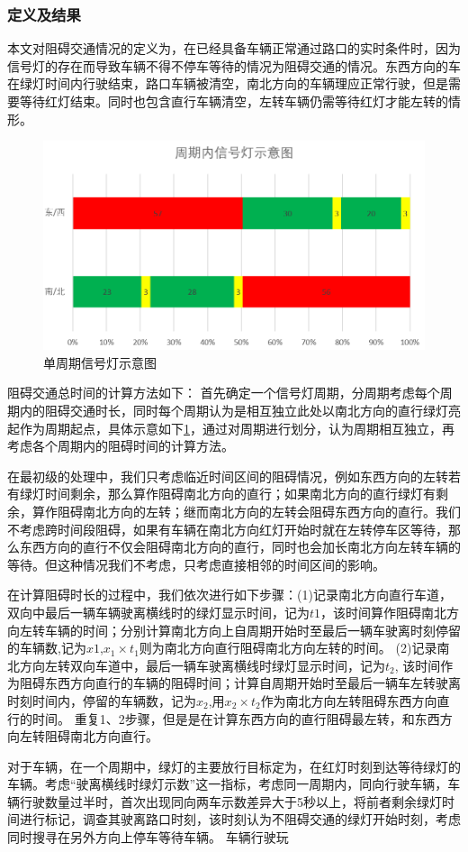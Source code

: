 \subsubsection{定义及结果}
本文对阻碍交通情况的定义为，在已经具备车辆正常通过路口的实时条件时，因为信号灯的存在而导致车辆不得不停车等待的情况为阻碍交通的情况。东西方向的车在绿灯时间内行驶结束，路口车辆被清空，南北方向的车辆理应正常行驶，但是需要等待红灯结束。同时也包含直行车辆清空，左转车辆仍需等待红灯才能左转的情形。


\begin{figure}[H]
    \centering
    \includegraphics[scale=0.5]{figures/单周期信号灯示意图.png}
    \caption{单周期信号灯示意图}
    \label{fig:单周期}
\end{figure}

阻碍交通总时间的计算方法如下：
首先确定一个信号灯周期，分周期考虑每个周期内的阻碍交通时长，同时每个周期认为是相互独立此处以南北方向的直行绿灯亮起作为周期起点，具体示意如下\ref{fig:单周期}，通过对周期进行划分，认为周期相互独立，再考虑各个周期内的阻碍时间的计算方法。

在最初级的处理中，我们只考虑临近时间区间的阻碍情况，例如东西方向的左转若有绿灯时间剩余，那么算作阻碍南北方向的直行；如果南北方向的直行绿灯有剩余，算作阻碍南北方向的左转；继而南北方向的左转会阻碍东西方向的直行。我们不考虑跨时间段阻碍，如果有车辆在南北方向红灯开始时就在左转停车区等待，那么东西方向的直行不仅会阻碍南北方向的直行，同时也会加长南北方向左转车辆的等待。但这种情况我们不考虑，只考虑直接相邻的时间区间的影响。

在计算阻碍时长的过程中，我们依次进行如下步骤：(1)记录南北方向直行车道，双向中最后一辆车辆驶离横线时的绿灯显示时间，记为$t1$，该时间算作阻碍南北方向左转车辆的时间；分别计算南北方向上自周期开始时至最后一辆车驶离时刻停留的车辆数,记为$x1$,$x_1\times t_1$则为南北方向直行阻碍南北方向左转的时间。
(2)记录南北方向左转双向车道中，最后一辆车驶离横线时绿灯显示时间，记为$t_2$, 该时间作为阻碍东西方向直行的车辆的阻碍时间；计算自周期开始时至最后一辆车左转驶离时刻时间内，停留的车辆数，记为$x_2$,用$x_2 \times t_2$作为南北方向左转阻碍东西方向直行的时间。
重复1、2步骤，但是是在计算东西方向的直行阻碍最左转，和东西方向左转阻碍南北方向直行。

对于车辆，在一个周期中，绿灯的主要放行目标定为，在红灯时刻到达等待绿灯的车辆。考虑“驶离横线时绿灯示数”这一指标，考虑同一周期内，同向行驶车辆，车辆行驶数量过半时，首次出现同向两车示数差异大于5秒以上，将前者剩余绿灯时间进行标记，调查其驶离路口时刻，该时刻认为不阻碍交通的绿灯开始时刻，考虑同时搜寻在另外方向上停车等待车辆。
车辆行驶玩